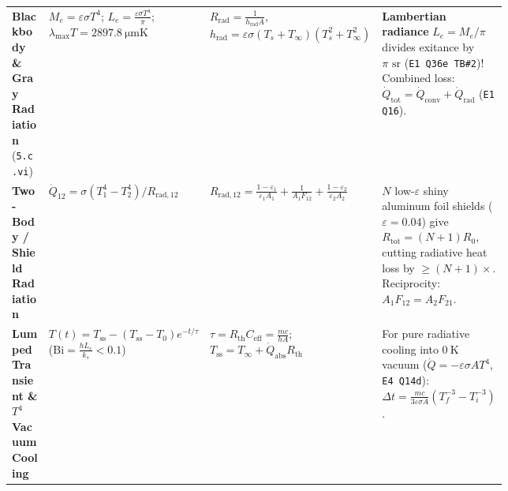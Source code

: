 {\begin{tabularx}{\linewidth}{@{}L{0.17\linewidth} L{0.31\linewidth} L{0.25\linewidth} X@{}}
\textbf{Blackbody \& Gray Radiation} (\texttt{5.c.vi}) & $M_e = \varepsilon\sigma T^4$; $L_e = \frac{\varepsilon\sigma T^4}{\pi}$; $\lambda_{\max}T = \SI{2897.8}{\micro\meter\kelvin}$ & $R_{\mathrm{rad}} = \frac{1}{h_{\mathrm{rad}} A}$, $h_{\mathrm{rad}} = \varepsilon\sigma(T_s+T_\infty)(T_s^2+T_\infty^2)$ & \textbf{Lambertian radiance} $L_e = M_e/\pi$ divides exitance by $\pi\text{ sr}$ (\texttt{E1 Q36e TB\#2})! Combined loss: $\dot{Q}_{\mathrm{tot}} = \dot{Q}_{\mathrm{conv}} + \dot{Q}_{\mathrm{rad}}$ (\texttt{E1 Q16}). \\
\textbf{Two-Body / Shield Radiation} & $\dot{Q}_{12} = \sigma(T_1^4 - T_2^4) / R_{\mathrm{rad},12}$ & $R_{\mathrm{rad},12} = \frac{1-\varepsilon_1}{\varepsilon_1 A_1} + \frac{1}{A_1 F_{12}} + \frac{1-\varepsilon_2}{\varepsilon_2 A_2}$ & $N$ low-$\varepsilon$ shiny aluminum foil shields ($\varepsilon = 0.04$) give $R_{\mathrm{tot}} = (N+1)R_0$, cutting radiative heat loss by $\ge (N+1)\times$. Reciprocity: $A_1 F_{12} = A_2 F_{21}$. \\
\textbf{Lumped Transient \& $T^4$ Vacuum Cooling} & $T(t) = T_{\mathrm{ss}} - (T_{\mathrm{ss}} - T_0)e^{-t/\tau}$ ($\mathrm{Bi} = \frac{hL_c}{k_s} < 0.1$) & $\tau = R_{\mathrm{th}}C_{\mathrm{eff}} = \frac{mc}{hA}$; $T_{\mathrm{ss}} = T_\infty + \dot{Q}_{\mathrm{abs}}R_{\mathrm{th}}$ & For pure radiative cooling into $\SI{0}{\kelvin}$ vacuum ($\dot{Q} = -\varepsilon\sigma A T^4$, \texttt{E4 Q14d}): $\Delta t = \frac{mc}{3\varepsilon\sigma A}(T_f^{-3} - T_i^{-3})$. \\
\bottomrule
\end{tabularx}
\par}\smallskip

